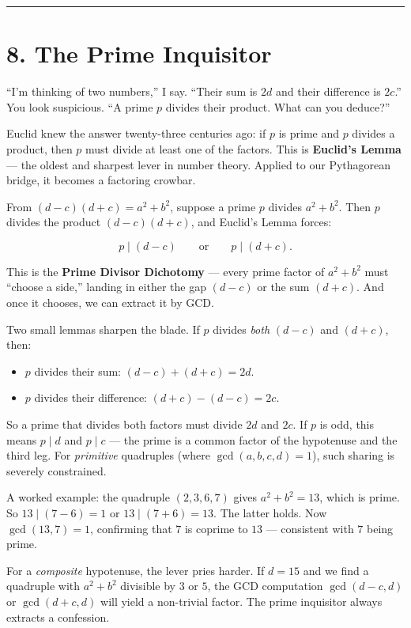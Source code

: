 \bigskip\noindent\rule{\linewidth}{0.4pt}\bigskip

\section{8. The Prime Inquisitor}
``I'm thinking of two numbers,'' I say. ``Their sum is \(2d\) and their difference is \(2c\).'' You look suspicious. ``A prime \(p\) divides their product. What can you deduce?''

Euclid knew the answer twenty-three centuries ago: if \(p\) is prime and \(p\) divides a product, then \(p\) must divide at least one of the factors. This is \textbf{Euclid's Lemma} --- the oldest and sharpest lever in number theory. Applied to our Pythagorean bridge, it becomes a factoring crowbar.

From \((d - c)(d + c) = a^2 + b^2\), suppose a prime \(p\) divides \(a^2 + b^2\). Then \(p\) divides the product \((d - c)(d + c)\), and Euclid's Lemma forces:

\[p \mid (d - c) \qquad \text{or} \qquad p \mid (d + c).\]

This is the \textbf{Prime Divisor Dichotomy} --- every prime factor of \(a^2 + b^2\) must ``choose a side,'' landing in either the gap \((d - c)\) or the sum \((d + c)\). And once it chooses, we can extract it by GCD.

Two small lemmas sharpen the blade. If \(p\) divides \emph{both} \((d - c)\) and \((d + c)\), then:

\begin{itemize}
\tightlist
\item
  \(p\) divides their sum: \((d - c) + (d + c) = 2d\).
\item
  \(p\) divides their difference: \((d + c) - (d - c) = 2c\).
\end{itemize}

So a prime that divides both factors must divide \(2d\) and \(2c\). If \(p\) is odd, this means \(p \mid d\) and \(p \mid c\) --- the prime is a common factor of the hypotenuse and the third leg. For \emph{primitive} quadruples (where \(\gcd(a, b, c, d) = 1\)), such sharing is severely constrained.

A worked example: the quadruple \((2, 3, 6, 7)\) gives \(a^2 + b^2 = 13\), which is prime. So \(13 \mid (7 - 6) = 1\) or \(13 \mid (7 + 6) = 13\). The latter holds. Now \(\gcd(13, 7) = 1\), confirming that \(7\) is coprime to \(13\) --- consistent with \(7\) being prime.

For a \emph{composite} hypotenuse, the lever pries harder. If \(d = 15\) and we find a quadruple with \(a^2 + b^2\) divisible by \(3\) or \(5\), the GCD computation \(\gcd(d - c, d)\) or \(\gcd(d + c, d)\) will yield a non-trivial factor. The prime inquisitor always extracts a confession.


